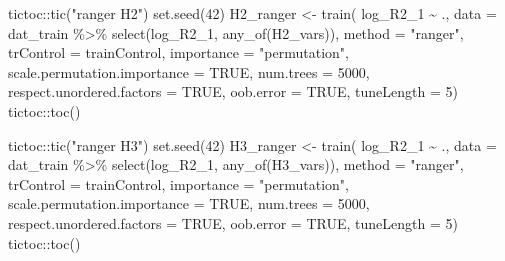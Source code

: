 \documentclass[
  letterpaper,
  DIV=11,
  numbers=noendperiod]{scrreprt}
\newenvironment{Shaded}{\begin{snugshade}}{\end{snugshade}}
\newcommand{\AttributeTok}[1]{\textcolor[rgb]{0.40,0.45,0.13}{#1}}
\newcommand{\ConstantTok}[1]{\textcolor[rgb]{0.56,0.35,0.01}{#1}}
\newcommand{\DecValTok}[1]{\textcolor[rgb]{0.68,0.00,0.00}{#1}}
\newcommand{\FunctionTok}[1]{\textcolor[rgb]{0.28,0.35,0.67}{#1}}
\newcommand{\NormalTok}[1]{\textcolor[rgb]{0.00,0.23,0.31}{#1}}
\newcommand{\OtherTok}[1]{\textcolor[rgb]{0.00,0.23,0.31}{#1}}
\newcommand{\SpecialCharTok}[1]{\textcolor[rgb]{0.37,0.37,0.37}{#1}}
\newcommand{\StringTok}[1]{\textcolor[rgb]{0.13,0.47,0.30}{#1}}
\begin{document}
\begin{Shaded}
\begin{Highlighting}[]
\NormalTok{tictoc}\SpecialCharTok{::}\FunctionTok{tic}\NormalTok{(}\StringTok{"ranger H2"}\NormalTok{)}
\FunctionTok{set.seed}\NormalTok{(}\DecValTok{42}\NormalTok{)}
\NormalTok{H2\_ranger }\OtherTok{\textless{}{-}} \FunctionTok{train}\NormalTok{(}
\NormalTok{    log\_R2\_1 }\SpecialCharTok{\textasciitilde{}}\NormalTok{ .,}
    \AttributeTok{data =}\NormalTok{ dat\_train }\SpecialCharTok{\%\textgreater{}\%} \FunctionTok{select}\NormalTok{(log\_R2\_1, }\FunctionTok{any\_of}\NormalTok{(H2\_vars)),}
    \AttributeTok{method =} \StringTok{"ranger"}\NormalTok{,}
    \AttributeTok{trControl =}\NormalTok{ trainControl,}
    \AttributeTok{importance =} \StringTok{"permutation"}\NormalTok{,}
    \AttributeTok{scale.permutation.importance =} \ConstantTok{TRUE}\NormalTok{,}
    \AttributeTok{num.trees =} \DecValTok{5000}\NormalTok{,}
    \AttributeTok{respect.unordered.factors =} \ConstantTok{TRUE}\NormalTok{,}
    \AttributeTok{oob.error =} \ConstantTok{TRUE}\NormalTok{,}
    \AttributeTok{tuneLength =} \DecValTok{5}\NormalTok{)}
\NormalTok{tictoc}\SpecialCharTok{::}\FunctionTok{toc}\NormalTok{()}


\NormalTok{tictoc}\SpecialCharTok{::}\FunctionTok{tic}\NormalTok{(}\StringTok{"ranger H3"}\NormalTok{)}
\FunctionTok{set.seed}\NormalTok{(}\DecValTok{42}\NormalTok{)}
\NormalTok{H3\_ranger }\OtherTok{\textless{}{-}} \FunctionTok{train}\NormalTok{(}
\NormalTok{    log\_R2\_1 }\SpecialCharTok{\textasciitilde{}}\NormalTok{ .,}
    \AttributeTok{data =}\NormalTok{ dat\_train }\SpecialCharTok{\%\textgreater{}\%} \FunctionTok{select}\NormalTok{(log\_R2\_1, }\FunctionTok{any\_of}\NormalTok{(H3\_vars)),}
    \AttributeTok{method =} \StringTok{"ranger"}\NormalTok{,}
    \AttributeTok{trControl =}\NormalTok{ trainControl,}
    \AttributeTok{importance =} \StringTok{"permutation"}\NormalTok{,}
    \AttributeTok{scale.permutation.importance =} \ConstantTok{TRUE}\NormalTok{,}
    \AttributeTok{num.trees =} \DecValTok{5000}\NormalTok{,}
    \AttributeTok{respect.unordered.factors =} \ConstantTok{TRUE}\NormalTok{,}
    \AttributeTok{oob.error =} \ConstantTok{TRUE}\NormalTok{,}
    \AttributeTok{tuneLength =} \DecValTok{5}\NormalTok{)}
\NormalTok{tictoc}\SpecialCharTok{::}\FunctionTok{toc}\NormalTok{()}


\end{Highlighting}
\end{Shaded}
\end{document}

